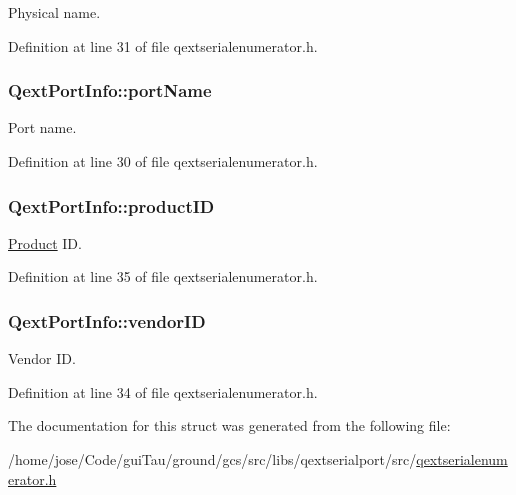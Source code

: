 Physical name. 



Definition at line 31 of file qextserialenumerator.\-h.

\hypertarget{struct_qext_port_info_ab28ecc59f84babdf486ab5fad74e024a}{
\subsubsection[{port\-Name}]{ Qext\-Port\-Info\-::port\-Name}}\label{struct_qext_port_info_ab28ecc59f84babdf486ab5fad74e024a}


Port name. 



Definition at line 30 of file qextserialenumerator.\-h.

\hypertarget{struct_qext_port_info_aff45380c6ad0250cfd8628032f45e948}{
\subsubsection[{product\-I\-D}]{ Qext\-Port\-Info\-::product\-I\-D}}\label{struct_qext_port_info_aff45380c6ad0250cfd8628032f45e948}


\hyperlink{class_product}{Product} I\-D. 



Definition at line 35 of file qextserialenumerator.\-h.

\hypertarget{struct_qext_port_info_a41e550f44b17021fbdd0ea3f2e896fcc}{
\subsubsection[{vendor\-I\-D}]{ Qext\-Port\-Info\-::vendor\-I\-D}}\label{struct_qext_port_info_a41e550f44b17021fbdd0ea3f2e896fcc}


Vendor I\-D. 



Definition at line 34 of file qextserialenumerator.\-h.



The documentation for this struct was generated from the following file\-:\begin{DoxyCompactItemize}
\item 
/home/jose/\-Code/gui\-Tau/ground/gcs/src/libs/qextserialport/src/\hyperlink{qextserialenumerator_8h}{qextserialenumerator.\-h}\end{DoxyCompactItemize}
